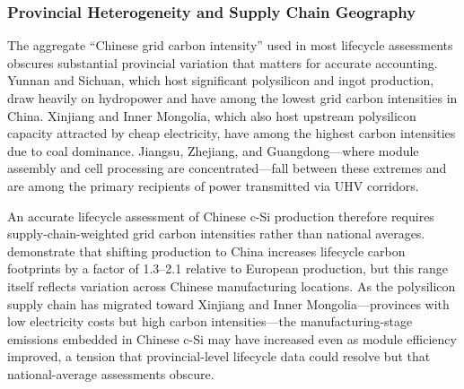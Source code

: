 \documentclass{article}
\begin{document}
 
 
\subsubsection{Provincial Heterogeneity and Supply Chain Geography}
 
The aggregate ``Chinese grid carbon intensity'' used in most lifecycle assessments obscures substantial provincial variation that matters for accurate accounting. Yunnan and Sichuan, which host significant polysilicon and ingot production, draw heavily on hydropower and have among the lowest grid carbon intensities in China. Xinjiang and Inner Mongolia, which also host upstream polysilicon capacity attracted by cheap electricity, have among the highest carbon intensities due to coal dominance. Jiangsu, Zhejiang, and Guangdong---where module assembly and cell processing are concentrated---fall between these extremes and are among the primary recipients of power transmitted via UHV corridors.
 
An accurate lifecycle assessment of Chinese c-Si production therefore requires supply-chain-weighted grid carbon intensities rather than national averages. \cite{dewild2013} demonstrate that shifting production to China increases lifecycle carbon footprints by a factor of 1.3--2.1 relative to European production, but this range itself reflects variation across Chinese manufacturing locations. As the polysilicon supply chain has migrated toward Xinjiang and Inner Mongolia---provinces with low electricity costs but high carbon intensities---the manufacturing-stage emissions embedded in Chinese c-Si may have increased even as module efficiency improved, a tension that provincial-level lifecycle data could resolve but that national-average assessments obscure.
 
\end{document}
